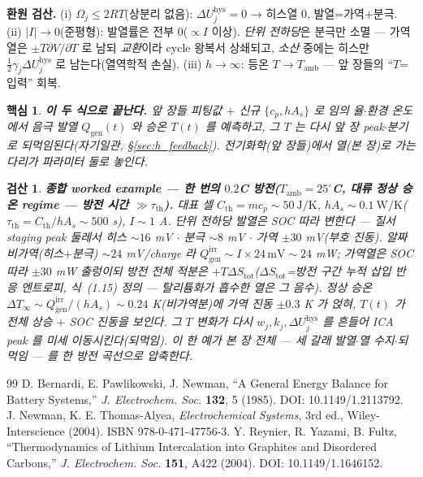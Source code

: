 \documentclass[11pt,a4paper]{article}
\newtheorem*{keybox}{핵심}
\newtheorem*{verifybox}{검산}
\newcommand{\hys}{\mathrm{hys}}
\newcommand{\irr}{\mathrm{irr}}
\newcommand{\gen}{\mathrm{gen}}
\newcommand{\amb}{\mathrm{amb}}
\newcommand{\Th}{\mathrm{th}}
\begin{document}
\textbf{환원 검산.} (i) $\Omega_j\le2RT$(상분리 없음): $\Delta U_j^\hys=0$ → 히스열 $0$, 발열=가역$+$분극. (ii)
$|I|\to0$(준평형): 발열률은 전부 $0$($\propto I$ 이상). \emph{단위 전하당}은 분극만 소멸 — 가역열은
$\pm T\partial V/\partial T$ 로 남되 \emph{교환}이라 cycle 왕복서 상쇄되고, \emph{소산} 중에는 히스만
$\tfrac12\gamma_j\Delta U_j^\hys$ 로 남는다(열역학적 손실). (iii) $h\to\infty$: 등온 $T\to T_\amb$ — 앞 장들의 ``$T$=입력'' 회복.
\begin{keybox}
\textbf{이 두 식으로 끝난다.} 앞 장들 피팅값 $+$ 신규 $\{c_p,hA_s\}$ 로 임의 율$\cdot$환경 온도에서 음극
발열 $Q_\gen(t)$ 와 승온 $T(t)$ 를 예측하고, 그 $T$ 는 다시 앞 장 peak$\cdot$분기로 되먹임된다(자기일관,
\S\ref{sec:h_feedback}). 전기화학(앞 장들)에서 열(본 장)로 가는 다리가 파라미터 \emph{둘}로 놓인다.
\end{keybox}
\begin{verifybox}
\textbf{종합 worked example — 한 번의 $0.2$C 방전($T_\amb=25^\circ$C, 대류 정상 승온 regime — 방전 시간
$\gg\tau_\Th$).} 대표 셀 $C_\Th=mc_p\sim50\
\mathrm{J/K}$, $hA_s\sim0.1\ \mathrm{W/K}$($\tau_\Th=C_\Th/hA_s\sim500$ s), $I\sim1$ A. 단위 전하당 발열은 SOC
따라 변한다 — 질서 staging peak 둘레서 히스 $\sim16$ mV $\cdot$ 분극 $\sim8$ mV $\cdot$ 가역 $\pm30$ mV(부호 진동).
알짜 비가역(히스$+$분극) $\sim24$ mV/charge 라 $Q_\gen^\irr\sim I\!\times\!24\,\mathrm{mV}\sim24$ mW; 가역열은 SOC
따라 $\pm30$ mW 출렁이되 방전 전체 적분은 $+T\Delta S_\mathrm{tot}$($\Delta S_\mathrm{tot}$=방전 구간 누적 \emph{삽입}
반응 엔트로피, 식~(1.15) 정의 — 탈리튬화가 흡수한 열은 그 음수). 정상 승온 $\Delta T_\infty\sim Q_\gen^\irr/(hA_s)
\sim0.24$ K(비가역분)에 가역 진동 $\pm0.3$ K 가 얹혀, $T(t)$ 가 \emph{전체 상승 $+$ SOC 진동}을 보인다. 그 $T$
변화가 다시 $w_j,k_j,\Delta U_j^\hys$ 를 흔들어 ICA peak 를 미세 이동시킨다(되먹임). \emph{이 한 예가 본 장 전체 —
세 갈래 발열$\cdot$열 수지$\cdot$되먹임 — 를 한 방전 곡선으로 압축한다}.
\end{verifybox}

\begin{thebibliography}{99}
 D. Bernardi, E. Pawlikowski, J. Newman, ``A General Energy Balance for Battery Systems,'' \emph{J. Electrochem. Soc.} \textbf{132}, 5 (1985). DOI: 10.1149/1.2113792.
\bibitem{newman2004} J. Newman, K. E. Thomas-Alyea, \emph{Electrochemical Systems}, 3rd ed., Wiley-Interscience (2004). ISBN 978-0-471-47756-3.
\bibitem{reynier2004} Y. Reynier, R. Yazami, B. Fultz, ``Thermodynamics of Lithium Intercalation into Graphites and Disordered Carbons,'' \emph{J. Electrochem. Soc.} \textbf{151}, A422 (2004). DOI: 10.1149/1.1646152.
\end{thebibliography}
\end{document}
